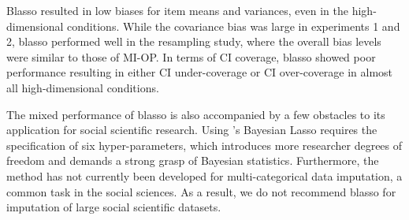 	Blasso resulted in low biases for item means and variances, even in the high-dimensional conditions.
	While the covariance bias was large in experiments 1 and 2, blasso performed well in the resampling study, 
	where the overall bias levels were similar to those of MI-OP.
	In terms of CI coverage, blasso showed poor performance resulting in either CI 
	under-coverage or CI over-coverage in almost all high-dimensional conditions.

	The mixed performance of blasso is also accompanied by a few obstacles to its application for social 
	scientific research.
	Using \cite{hans:2010}'s Bayesian Lasso requires the specification of six hyper-parameters, which 
	introduces more researcher degrees of freedom and demands a strong grasp of Bayesian statistics.
	Furthermore, the method has not currently been developed for multi-categorical data imputation,
	a common task in the social sciences.
	As a result, we do not recommend blasso for imputation of large social scientific datasets.
